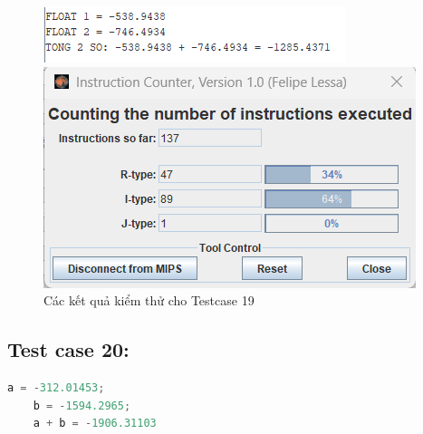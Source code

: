 \begin{figure}[!h]
    \centering
    \begin{minipage}[b]{0.48\textwidth}
        \centering
        \includegraphics[width=\textwidth]{image/TESTCASE/Testcase 19.png}
    \end{minipage}
    \hfill
    \begin{minipage}[b]{0.48\textwidth}
        \centering
        \includegraphics[width=\textwidth]{image/TESTCASE/Instruction Counter 19.png}
    \end{minipage}
    \vspace{0.5cm}
    \caption{Các kết quả kiểm thử cho Testcase 19}
\end{figure}


\subsection{Test case 20:}
\begin{lstlisting}[language=Python]
    a = -312.01453;
    b = -1594.2965;
    a + b = -1906.31103
\end{lstlisting}

